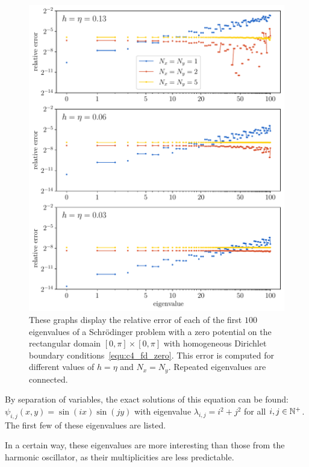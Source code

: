 \begin{figure}
    \begin{center}
        \includegraphics[width=\textwidth]{img/chapter4/fd_zero.pdf}
    \end{center}
    \caption{These graphs display the relative error of each of the first $100$ eigenvalues of a Schrödinger problem with a zero potential on the rectangular domain $[0, \pi] \times [0, \pi]$ with homogeneous Dirichlet boundary conditions~\eqref{equ:c4_fd_zero}. This error is computed for different values of $h = \eta$ and $N_x = N_y$. Repeated eigenvalues are connected.}
    \label{fig:c4_fd_zero}
\end{figure}

By separation of variables, the exact solutions of this equation can be found: $\psi_{i, j}(x, y) = \sin(i x)\sin(j y)$ with eigenvalue $\lambda_{i,j} = i^2 + j^2$ for all $i, j \in \mathbb{N}^{+}$. The first few of these eigenvalues are listed.


In a certain way, these eigenvalues are more interesting than those from the harmonic oscillator, as their multiplicities are less predictable.

